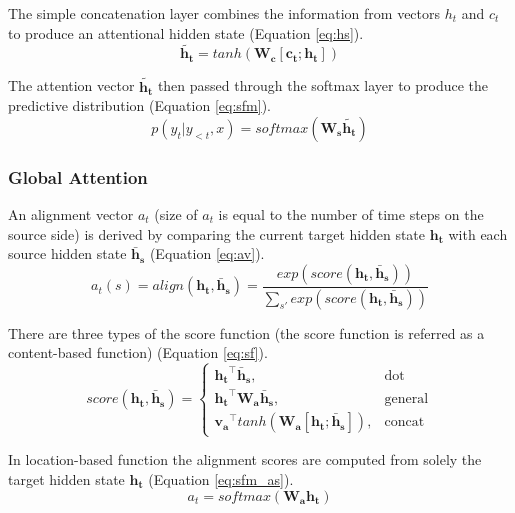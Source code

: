 The simple concatenation layer combines the information from vectors $h_t$ and $c_t$ to produce an attentional hidden state (Equation \ref{eq:hs}).
\begin{equation} \label{eq:hs}
\mathbf{\widetilde{h_t}} = tanh(\mathbf{W_c}[\mathbf{c_t};\mathbf{h_t}])
\end{equation}

The attention vector $\mathbf{\widetilde{h_t}}$ then passed through the softmax layer to produce the predictive distribution (Equation \ref{eq:sfm}).
\begin{equation} \label{eq:sfm}
p(y_t|y_{<t},x) = softmax(\mathbf{W_s}\mathbf{\widetilde{h_t}})
\end{equation}

\subsubsection{Global Attention}
An alignment vector $a_t$ (size of $a_t$ is equal to the number of time steps on the source side) is derived by comparing the current target hidden state $\mathbf{h_t}$ with each source hidden state $\mathbf{\bar{h}_s}$ (Equation \ref{eq:av}).
\begin{equation} \label{eq:av}
a_t(s) = align(\mathbf{h_t}, \mathbf{\bar{h}_s}) = \frac{exp(score(\mathbf{h_t}, \mathbf{\bar{h}_s}))}{\sum_{s'} exp(score(\mathbf{h_t}, \mathbf{\bar{h}_s}))}
\end{equation}

There are three types of the score function (the score function is referred as a content-based function) (Equation \ref{eq:sf}).
\begin{equation}\label{eq:sf}
score(\mathbf{h_t}, \mathbf{\bar{h}_s}) = \begin{cases} \mathbf{h_t}^\intercal \mathbf{\bar{h}_s}, & \mbox{dot} \\ \mathbf{h_t}^\intercal \mathbf{W_a} \mathbf{\bar{h}_s}, & \mbox{general} \\ \mathbf{v_a}^\intercal tanh(\mathbf{W_a} [\mathbf{h_t}; \mathbf{\bar{h}_s}]), & \mbox{concat} \end{cases}
\end{equation}

In location-based function the alignment scores are computed from solely the target hidden state $\mathbf{h_t}$ (Equation \ref{eq:sfm_as}).
\begin{equation} \label{eq:sfm_as}
a_t = softmax(\mathbf{W_a}\mathbf{h_t})
\end{equation}

